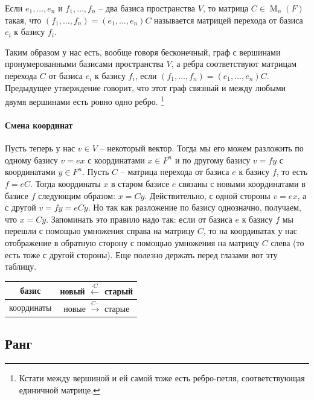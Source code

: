 \begin{definition}
\label{def::ChangeMatrix}
Если $e_1,\ldots,e_n$ и $f_1,\ldots,f_n$ -- два базиса пространства $V$, то матрица $C\in \operatorname{M}_n(F)$ такая, что $(f_1,\ldots, f_n) = (e_1,\ldots,e_n)C$ называется матрицей перехода от базиса $e_i$ к базису $f_i$.
\end{definition}

Таким образом у нас есть, вообще говоря бесконечный, граф с вершинами пронумерованными базисами пространства $V$, а ребра соответствуют матрицам перехода $C$ от базиса $e_i$ к базису $f_i$, если $(f_1,\ldots,f_n) = (e_1,\ldots,e_n)C$.
Предыдущее утверждение говорит, что этот граф связный и между любыми двумя вершинами есть ровно одно ребро.%
\footnote{Кстати между вершиной и ей самой тоже есть ребро-петля, соответствующая единичной матрице.}

\paragraph{Смена координат}

Пусть теперь у нас $v\in V$ -- некоторый вектор.
Тогда мы его можем разложить по одному базису $v = ex$ с координатами $x\in F^n$ и по другому базису $v = f y$ с координатами $y \in F^n$.
Пусть $C$ -- матрица перехода от базиса $e$ к базису $f$, то есть $f = e C$.
Тогда координаты $x$ в старом базисе $e$ связаны с новыми координатами в базисе $f$ следующим образом: $x = Cy$.
Действительно, с одной стороны $v = ex$, а с другой $v = f y = eC y$.
Но так как разложение по базису однозначно, получаем, что $x = Cy$.
Запоминать это правило надо так: если от базиса $e$ к базису $f$ мы перешли с помощью умножения справа на матрицу $C$, то на координатах у нас отображение в обратную сторону с помощью умножения на матрицу $C$ слева (то есть тоже с другой стороны).
Еще полезно держать перед глазами вот эту таблицу.
\begin{center}
\begin{tabular}{c|c}
{базис}&{новый $\stackrel{\cdot C}{\longleftarrow}$ старый}\\
\hline
{координаты}&{новые $\stackrel{C\cdot}{\longrightarrow}$ старые}\\
\end{tabular}
\end{center}

\subsection{Ранг}

